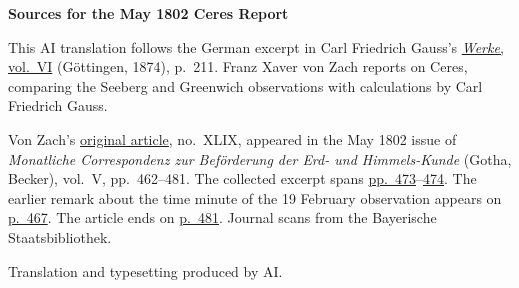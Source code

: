 \clearpage\thispagestyle{empty}
\begin{center}\textbf{Sources for the May 1802 Ceres Report}\end{center}
\noindent This AI translation follows the German excerpt in Carl Friedrich Gauss’s \href{https://gdz.sub.uni-goettingen.de/id/PPN236007467}{\textit{Werke}, vol.~VI} (Göttingen, 1874), p.~211. Franz Xaver von Zach reports on Ceres, comparing the Seeberg and Greenwich observations with calculations by Carl Friedrich Gauss.
\par\smallskip\noindent Von Zach’s \href{https://api.digitale-sammlungen.de/iiif/image/v2/bsb10538597_00474/full/1450,/0/default.jpg}{original article}, no.~XLIX, appeared in the May 1802 issue of \textit{Monatliche Correspondenz zur Beförderung der Erd- und Himmels-Kunde} (Gotha, Becker), vol.~V, pp.~462--481. The collected excerpt spans \href{https://api.digitale-sammlungen.de/iiif/image/v2/bsb10538597_00485/full/1450,/0/default.jpg}{pp.~473}--\href{https://api.digitale-sammlungen.de/iiif/image/v2/bsb10538597_00486/full/1450,/0/default.jpg}{474}. The earlier remark about the time minute of the 19 February observation appears on \href{https://api.digitale-sammlungen.de/iiif/image/v2/bsb10538597_00479/full/1450,/0/default.jpg}{p.~467}. The article ends on \href{https://api.digitale-sammlungen.de/iiif/image/v2/bsb10538597_00493/full/1450,/0/default.jpg}{p.~481}. Journal scans from the Bayerische Staatsbibliothek.
\par\smallskip\noindent Translation and typesetting produced by AI.
\clearpage

